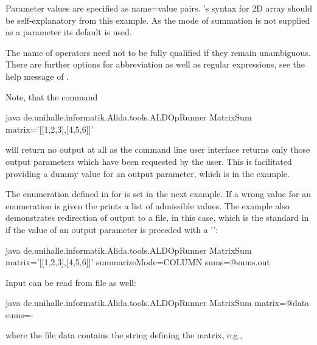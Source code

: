 Parameter values are specified as name=value pairs.
\alida's syntax for 2D array should be self-explanatory  from this example.
As the mode of summation is not supplied as a parameter its default is used.

The name of operators need not to be fully qualified if  they remain
unambiguous.
There are further options for abbreviation as well as regular expressions, see the help message of
.

Note, that the command
\begin{code}
java de.unihalle.informatik.Alida.tools.ALDOpRunner MatrixSum matrix='[[1,2,3],[4,5,6]]' 
\end{code}
will return no output at all as the command line user interface returns only  those output parameters which have been requested by the user.
This is facilitated providing a dummy value for an output parameter, which is
\icode{-} in the example.

The enumeration defined in  
for  
is set in the next example.
If a wrong value for an enumeration is given the 
prints a list of admissible values.
The example also demonstrates redirection of output
to a file,  in this case, which is the standard in \alida if the
value of an output parameter is preceded with a '':\\[0.25cm]
\begin{code}
java de.unihalle.informatik.Alida.tools.ALDOpRunner MatrixSum matrix='[[1,2,3],[4,5,6]]' 
	summarizeMode=COLUMN sums=@sums.out
\end{code}

Input can be read from file as well:
\begin{code}
java de.unihalle.informatik.Alida.tools.ALDOpRunner MatrixSum matrix=@data sums=-
\end{code}

where the file data contains the string defining the matrix, e.g.,
\icode{[[1,2,3],[4,5,6]]}



